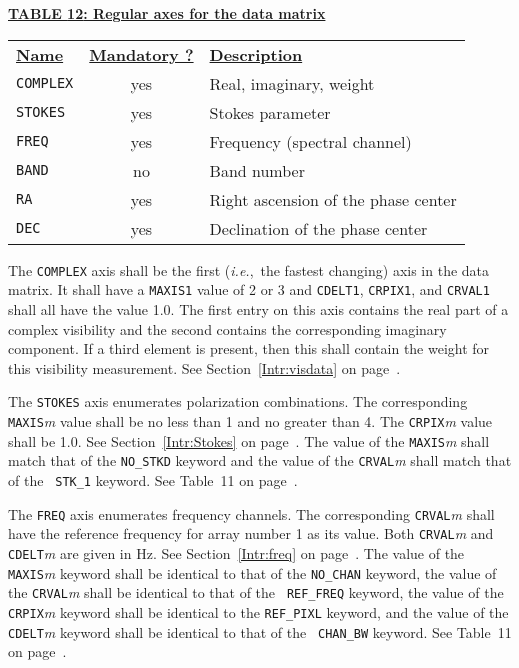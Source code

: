 \documentclass[twoside]{article}
\newcommand{\Hi}[1]{\textcolor{hicol}{#1}}
\newcommand{\ie}{{\it i.e.},}
\begin{document}
\begin{center}
\underline{\bf{TABLE \Hi{12}: Regular axes for the data matrix}}\\
\begin{tabular}{lcl}
\noalign{\vspace{2pt}}
\underline{{\bf Name\vphantom{y}}} & \underline{\bf{Mandatory ?}} &
    \underline{\bf{Description}} \\
\noalign{\vspace{2pt}}
{\tt COMPLEX} & yes & Real, imaginary, weight \\
{\tt STOKES}  & yes & Stokes parameter \\
{\tt FREQ}    & yes & Frequency (spectral channel) \\
{\tt BAND}    & no  & Band number \\
{\tt RA}      & yes & Right ascension of the phase center \\
{\tt DEC}     & yes & Declination of the phase center
\end{tabular}
\end{center}

The {\tt COMPLEX} axis shall be the first (\ie\ the fastest changing)
axis in the data matrix.  It shall have a {\tt MAXIS1} value of 2 or 3
and {\tt CDELT1}, {\tt CRPIX1}, and {\tt CRVAL1} shall all have the
value 1.0.  The first entry on this axis contains the real part of a
complex visibility and the second contains the corresponding imaginary
component.  If a third element is present, then this shall contain the
weight for this visibility measurement.  See
Section~\ref{Intr:visdata} on page~\pageref{Intr:visdata}.

The {\tt STOKES} axis enumerates polarization combinations.  The
corresponding {\tt MAXIS}{\it m} value shall be no less than 1 and no
greater than 4.  The {\tt CRPIX}{\it m} value shall be 1.0.  See
Section~\ref{Intr:Stokes} on page~\pageref{Intr:Stokes}.  The value of
the {\tt MAXIS}{\it m} shall match that of the {\tt NO\_STKD} keyword
and the value of the {\tt CRVAL}{\it m} shall match that of the {\tt
  STK\_1} keyword.  See Table~11 on page~\pageref{ta:keywords}.

The {\tt FREQ} axis enumerates frequency channels.  The corresponding
{\tt CRVAL}{\it m} shall have the reference frequency for array number
1 as its value.  Both {\tt CRVAL}{\it m} and {\tt CDELT}{\it m} are
given in Hz.  See Section~\ref{Intr:freq} on
page~\pageref{Intr:freq}.  The value of the {\tt MAXIS}{\it m} keyword
shall be identical to that of the {\tt NO\_CHAN} keyword, the value
of the {\tt CRVAL}{\it m} shall be identical to that of the {\tt
REF\_FREQ} keyword, the value of the {\tt CRPIX}{\it m} keyword shall
be identical to the {\tt REF\_PIXL} keyword, and the value of the {\tt
CDELT}{\it m} keyword shall be identical to that of the {\tt
CHAN\_BW} keyword.  See Table~11 on page~\pageref{ta:keywords}.
\end{document}
